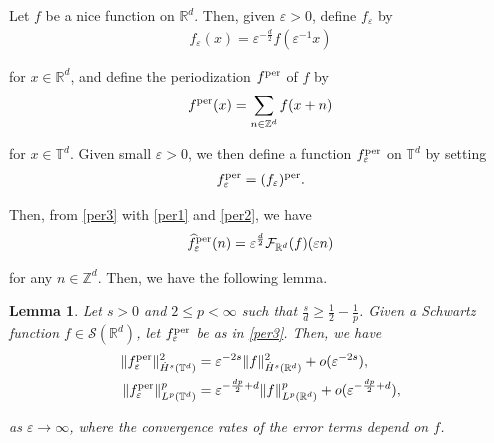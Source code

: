 \documentclass[letterpaper, 11pt,  reqno]{amsart}
\newtheorem{lemma}[theorem]{Lemma}
\newcommand{\noi}{\noindent}
\newcommand{\Z}{\mathbb{Z}}
\newcommand{\R}{\mathbb{R}}
\newcommand{\T}{\mathbb{T}}
\newcommand{\F}{\mathcal{F}}
\newcommand{\eps}{\varepsilon}
\newcommand{\ft}{\widehat}
\renewcommand{\S}{\mathcal{S}}
\numberwithin{equation}{section}
\numberwithin{theorem}{section}
\newcommand{\per}{\textup{per}}
\begin{document}
\medskip




Let $f$ be  a nice function  on $\R^d$.
Then, given $\eps > 0$, 
define $f_\eps$ by 
\begin{align}
f_\eps(x) = \eps^{-\frac d2}f(\eps^{-1} x)
\label{per1}
\end{align}

\noi
for $x \in \R^d$, 
and define the periodization $f^\per$ of $f$ by 
\begin{align}
f^\per(x) = \sum_{n \in \Z^d} f(x + n)
\label{per2}
\end{align}



\noi
for $x \in \T^d$.
Given small $\eps > 0$, 
we  then define a function  $f_\eps^\per$ on $\T^d$ by setting
\begin{align}
f_\eps^\per = (f_\eps)^\per.
\label{per3}
\end{align}

\noi
Then, 
from \eqref{per3} with \eqref{per1} and \eqref{per2}, 
we have 
\begin{align}
\ft f_\eps^\per(n) = \eps^\frac d2 \F_{\R^d} (f) (\eps n)
\label{per4}
\end{align}

\noi
for any $n \in \Z^d$.
Then, we have the following lemma.




\begin{lemma}
\label{LEM:sol1} 
Let $s > 0 $ and $2 \leq p < \infty$
such that $\frac sd \ge \frac 12 - \frac 1p$.
Given  a Schwartz function $f\in  \S(\R^d)$, 
let $f_\eps^\per$ be as in \eqref{per3}.
Then, we have 
\begin{align}
\| f_\eps^\per  \|^2_{\dot{H}^s (\mathbb{T}^d)}
&=  \eps^{-2s} \| f \|^2_{\dot H^{s} (\R^d)} + o(\eps^{-2s}), 
\label{SO1}\\
\| f_\eps^\per  \|_{L^p (\mathbb{T}^d)}^p &=
\eps^{-\frac{d p}{2} + d} \| f \|^p_{L^p (\R^d)} + o (\eps^{-\frac{d p}{2}+d}), 
  \label{SO2}
\end{align}
	

\noi
as $\eps \to \infty$, 
where the convergence rates of the error terms depend on $f$.
	
\end{lemma}
\end{document}
